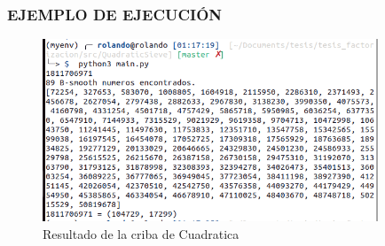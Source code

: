 \subsubsection{EJEMPLO DE EJECUCIÓN}
\begin{figure}[H]
    \centering
    \includegraphics[width=10cm]{images/criba_cuadratica_prueba.png}
    \caption{Resultado de la criba de Cuadratica}
    \label{eratostenes}
\end{figure}